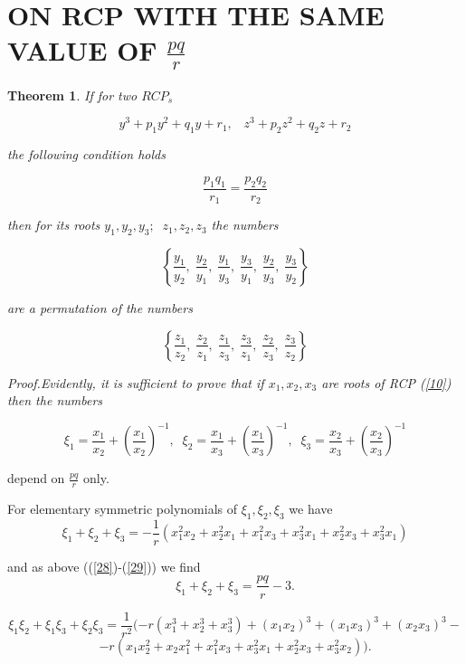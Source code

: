 \documentclass[12pt,oneside,english]{amsart}
\newtheorem{theorem}{Theorem}
\begin{document}
\section{ON RCP WITH THE SAME VALUE OF $\frac{pq}{r}$}\label{s5}

\begin{theorem}\label{thm5}
\slshape  If for two $RCP_s$

$$
y^3+p_1y^2+q_1y+r_1, \;\;\;z^3+p_2z^2+q_2z+r_2
$$

the following condition holds

$$
\frac{p_1q_1}{r_1}=\frac{p_2q_2}{r_2}
$$

then for its roots $y_1, y_2, y_3;\;\;z_1, z_2, z_3$ the numbers

$$
\left\{\frac{y_1}{y_2},\;\frac{y_2}{y_1},\;\frac{y_1}{y_3},\;\frac{y_3}{y_1},
\;\frac{y_2}{y_3},\;\frac{y_3}{y_2}\right\}
$$

are a permutation of the numbers

$$
\left\{\frac{z_1}{z_2},\;\frac{z_2}{z_1},\;\frac{z_1}{z_3},\;\frac{z_3}{z_1},
\;\frac{z_2}{z_3},\;\frac{z_3}{z_2}\right\}
$$
\upshape
\end{theorem}

\slshape  Proof.\upshape  Evidently, it is sufficient to prove that
if $x_1, x_2, x_3$ are roots of RCP (\ref{10}) then the numbers

\begin{equation}\label{34}
\xi_1=\frac{x_1}{x_2}+(\frac{x_1}{x_2})^{-1},
\;\;\xi_2=\frac{x_1}{x_3}+(\frac{x_1}{x_3})^{-1},\;\;
\xi_3=\frac{x_2}{x_3}+(\frac{x_2}{x_3})^{-1}
\end{equation}

depend on $\frac{pq}{r}$ only.

For elementary symmetric polynomials of $\xi_1, \xi_2, \xi_3$ we
have
\begin{equation}\label{35}
\xi_1+\xi_2+\xi_3=-\frac 1 r (x_1^2x_2+x_2^2x_1+x_1^2x_3+x_3^2x_1+
x_2^2x_3+x_3^2x_1)
\end{equation}

and as above ((\ref{28})-(\ref{29})) we find
\begin{equation}\label{36}
\xi_1+\xi_2+\xi_3=\frac{pq}{r}-3.
\end{equation}

$$
\xi_1\xi_2+\xi_1\xi_3+\xi_2\xi_3=\frac{1}{r^2}(-r(x_1^3+x_2^3+x_3^3)+
(x_1x_2)^3+(x_1x_3)^3+(x_2x_3)^3-
$$
$$
-r(x_1x_2^2+x_2x_1^2+x_1^2x_3+x_3^2x_1+x_2^2x_3+x_3^2x_2)).
$$

\newpage
\end{document}

